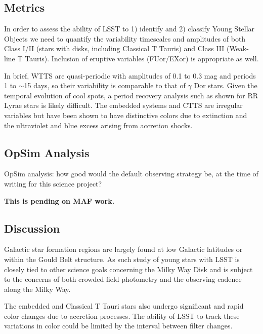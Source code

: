 



\subsection{Metrics}
\label{sec:\secname:metrics}

In order to assess the ability of LSST to 1) identify and 2) classify
Young Stellar Objects we need to quantify the variability timescales and amplitudes of
both Class I/II (stars with disks, including Classical T Tauris) and Class III (Weak-line T Tauris). 
Inclusion of eruptive variables (FUor/EXor) is appropriate as well.

In brief, WTTS are quasi-periodic with amplitudes of 0.1 to 0.3 mag
and periods 1 to $\sim$15 days, so their variability is comparable to 
that of $\gamma$ Dor stars. Given the temporal evolution of cool spots, a
period recovery analysis such as shown for RR Lyrae stars is likely difficult. 
The embedded systems and CTTS are irregular variables but have been shown 
to have distinctive colors due to
extinction and the ultraviolet and blue excess arising from accretion shocks.


\subsection{OpSim Analysis}
\label{sec:\secname:analysis}

OpSim analysis: how good would the default observing strategy be, at
the time of writing for this science project?

{\bf This is pending on MAF work.}



\subsection{Discussion}
\label{sec:\secname:discussion}

Galactic star formation regions are largely found at low Galactic latitudes or within 
the Gould Belt structure. As such study of young stars with LSST is closely tied to other
science goals concerning the Milky Way Disk and is subject to the concerns of both
crowded field photometry and the observing cadence along the Milky Way.

The embedded and Classical T Tauri stars also undergo significant and rapid color changes
due to accretion processes. The ability of LSST to track these variations in color could
be limited by the interval between filter changes.


\navigationbar
